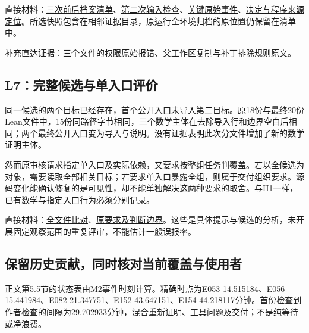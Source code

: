 直接材料：\href{research/analysis_20260915/final_research_supplement_20260915/evidence/handoff_inventory.json}{三次前后档案清单}、\href{research/analysis_20260915/final_research_supplement_20260915/evidence/M2_information_checks.json}{第二次输入检查}、\href{research/analysis_20260915/final_research_supplement_20260915/evidence/selected_events.json}{关键原始事件}、\href{research/analysis_20260915/final_research_supplement_20260915/evidence/DECISION_SOURCES.zh-CN.md}{决定与程序来源定位}。所选快照包含在相邻证据目录，原运行全环境归档的原位置仍保留在清单中。

补充直达证据：\href{verification/revision30/M2_export.stderr.txt}{三个文件的权限原始报错}、\href{verification/revision30/M2_runtime_excerpts.json}{父工作区复制与补丁排除规则原文}。

\subsection[L7：完整候选与单入口评价]{\texorpdfstring{\protect\hypertarget{u4}{}L7：完整候选与单入口评价}{L7：完整候选与单入口评价}}
同一候选的两个目标已经存在，首个公开入口未导入第二目标。原18份与最终20份Lean文件中，15份同路径字节相同，三个数学主体在去除导入行和边界空白后相同；两个最终公开入口变为导入与说明。没有证据表明此次分文件增加了新的数学证明主体。

然而原审核请求指定单入口及实际依赖，又要求按整组任务判覆盖。若以全候选为对象，需要读取全部相关目标；若要求单入口暴露全组，则属于交付组织要求。源码变化能确认修复的是可见性，却不能单独解决这两种要求的取舍。与H1一样，已有数学与指定入口行为必须分别记录。

直接材料：\href{research/analysis_20260915/two_pass_review_20260915/round1/l7_all_files.json}{全文件比对}、\href{research/analysis_20260915/two_pass_review_20260915/review/STANDARDS.zh-CN.md}{原要求及判断边界}。这些是具体提示与候选的分析，未开展固定观察范围的重复评审，不能估计一般误报率。

\subsection[保留历史贡献，同时核对当前覆盖与使用者]{\texorpdfstring{\protect\hypertarget{u5}{}保留历史贡献，同时核对当前覆盖与使用者}{保留历史贡献，同时核对当前覆盖与使用者}}
正文第5.5节的状态表由M2事件时刻计算。精确时点为E053 14.515184、E056 15.441984、E082 21.347751、E152 43.647151、E154 44.218117分钟。首份检查到作者检查的间隔为29.702933分钟，混合重新证明、工具问题及交付；不是纯等待或净浪费。

